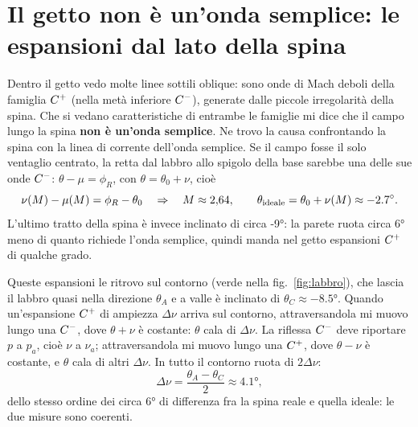 \section*{Il getto non è un'onda semplice: le espansioni dal lato della spina}
Dentro il getto vedo molte linee sottili oblique: sono onde di Mach deboli della famiglia $C^{+}$ (nella metà inferiore
$C^{-}$), generate dalle piccole irregolarità della spina. Che si vedano caratteristiche di entrambe le famiglie mi dice
che il campo lungo la spina \textbf{non è un'onda semplice}. Ne trovo la causa confrontando la spina con la linea di
corrente dell'onda semplice. Se il campo fosse il solo ventaglio centrato, la retta dal labbro allo spigolo della base
sarebbe una delle sue onde $C^{-}$: $\theta-\mu=\phi_R$, con $\theta=\theta_0+\nu$, cioè
\[
\nu(M)-\mu(M)=\phi_R-\theta_0\quad\Rightarrow\quad M\approx2{,}64,\qquad
\theta_{\rm ideale}=\theta_0+\nu(M)\approx\ang{-2.7}.
\]
L'ultimo tratto della spina è invece inclinato di circa \ang{-9}: la parete ruota circa \ang{6} meno di quanto richiede
l'onda semplice, quindi manda nel getto espansioni $C^{+}$ di qualche grado.

Queste espansioni le ritrovo sul contorno (verde nella fig.~\ref{fig:labbro}), che lascia il labbro quasi nella direzione $\theta_A$ e a valle è inclinato
di $\theta_C\approx\ang{-8.5}$. Quando un'espansione $C^{+}$ di ampiezza $\Delta\nu$ arriva sul contorno, attraversandola
mi muovo lungo una $C^{-}$, dove $\theta+\nu$ è costante: $\theta$ cala di $\Delta\nu$. La riflessa $C^{-}$ deve riportare
$p$ a $p_a$, cioè $\nu$ a $\nu_a$; attraversandola mi muovo lungo una $C^{+}$, dove $\theta-\nu$ è costante, e $\theta$
cala di altri $\Delta\nu$. In tutto il contorno ruota di $2\Delta\nu$:
\[
\Delta\nu=\frac{\theta_A-\theta_C}{2}\approx\ang{4.1},
\]
dello stesso ordine dei circa \ang{6} di differenza fra la spina reale e quella ideale: le due misure sono coerenti.


